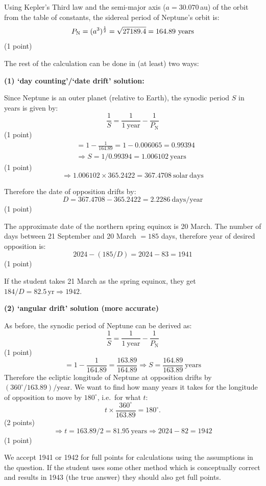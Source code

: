 Using Kepler's Third law and the semi-major axis ($a = 30.070$\,au) of the
orbit from the table of constants, the sidereal period of Neptune's orbit is:
\[
  P_{\mathrm{N}} = (a^3)^{\frac{1}{2}} = \sqrt{27189.4}
    = 164.89\ \mathrm{years} \hfill
\]
\hfill(1 point)

The rest of the calculation can be done in (at least) two ways:

\medskip
\noindent\textbf{(1) `day counting'/`date drift' solution:}

Since Neptune is an outer planet (relative to Earth), the synodic period $S$ in
years is given by:
\[
  \frac{1}{S} = \frac{1}{1\ \mathrm{year}} - \frac{1}{P_{\mathrm{N}}}
\]
\hfill(1 point)
\begin{align*}
  &= 1 - \frac{1}{164.89} = 1 - 0.006065 = 0.99394\\
  &\Longrightarrow S = 1/0.99394 = 1.006102\ \mathrm{years}
\end{align*}
\hfill(1 point)
\[
  \Longrightarrow 1.006102 \times 365.2422 = 367.4708\ \mathrm{solar\ days}
\]

Therefore the date of opposition drifts by:
\[
  D = 367.4708 - 365.2422 = 2.2286\ \mathrm{days/year}
\]
\hfill(1 point)

The approximate date of the northern spring equinox is 20 March. The number of
days between 21 September and 20 March $= 185$ days, therefore year of desired
opposition is:
\[
  2024 - (185/D) = 2024 - 83 = 1941
\]
\hfill(1 point)

If the student takes 21 March as the spring equinox, they get
$184/D = 82.5\,\mathrm{yr} \Longrightarrow 1942$.

\medskip
\noindent\textbf{(2) `angular drift' solution (more accurate)}

As before, the synodic period of Neptune can be derived as:
\[
  \frac{1}{S} = \frac{1}{1\ \mathrm{year}} - \frac{1}{P_{\mathrm{N}}}
\]
\hfill(1 point)
\[
  = 1 - \frac{1}{164.89} = \frac{163.89}{164.89}
  \Longrightarrow S = \frac{164.89}{163.89}\ \mathrm{years}
\]
Therefore the ecliptic longitude of Neptune at opposition drifts by
$(360^\circ/163.89)/\mathrm{year}$. We want to find how many years it takes for
the longitude of opposition to move by $180^\circ$, i.e.\ for what $t$:
\[
  t \times \frac{360^\circ}{163.89} = 180^\circ.
\]
\hfill(2 points)
\[
  \Longrightarrow t = 163.89/2 = 81.95\ \mathrm{years}
  \Longrightarrow 2024 - 82 = 1942
\]
\hfill(1 point)

We accept 1941 or 1942 for full points for calculations using the assumptions
in the question. If the student uses some other method which is conceptually
correct and results in 1943 (the true answer) they should also get full
points.


